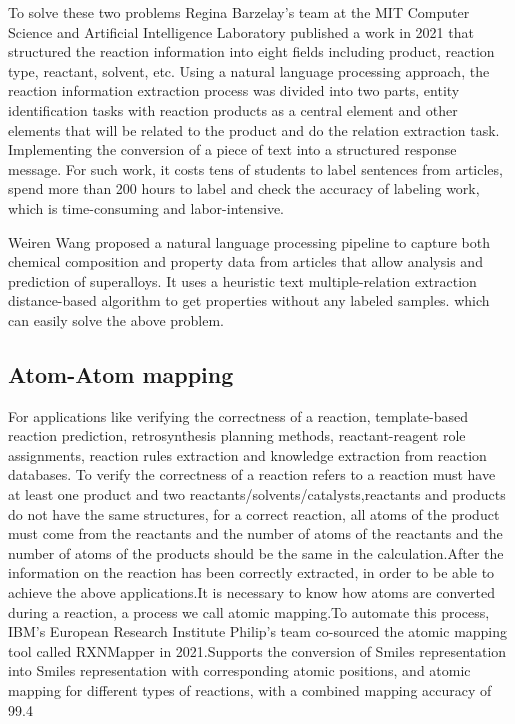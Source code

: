 \documentclass[%
 aip,
 jmp,%
 amsmath,amssymb,
 reprint,%
]{revtex4-2}
\begin{document}
To solve these two problems Regina Barzelay's team at the MIT Computer Science and Artificial Intelligence Laboratory published a work 
in 2021 that structured the reaction information into eight fields including product, reaction type, reactant, solvent, etc. Using a 
natural language processing approach, the reaction information extraction process was divided into two parts, entity identification tasks
with reaction products as a central element and other elements that will be related to the product and do the relation extraction task.
Implementing the conversion of a piece of text into a structured response message. For such work, it costs tens of students to label sentences
from articles, spend more than 200 hours to label and check the accuracy of labeling work, which is time-consuming and labor-intensive.

Weiren Wang proposed a natural language processing pipeline to capture both chemical composition and property data from articles that allow analysis
and prediction of superalloys. It uses a heuristic text multiple-relation extraction distance-based algorithm to get properties without any labeled samples.
which can easily solve the above problem.

\subsection{Atom-Atom mapping}
For applications like verifying the correctness of a reaction, template-based reaction prediction, 
retrosynthesis planning methods, reactant-reagent role assignments, reaction rules extraction and knowledge
extraction from reaction databases. To verify the correctness of a reaction refers to a reaction must have 
at least one product and two reactants/solvents/catalysts,reactants and products do not have the same structures,
for a correct reaction, all atoms of the product must come from the reactants and the number of atoms of the
reactants and the number of atoms of the products should be the same in the calculation.After the information on 
the reaction has been correctly extracted, in order to be able to achieve the above applications.It is necessary
to know how atoms are converted during a reaction, a process we call atomic mapping.To automate this process, 
IBM's European Research Institute Philip's team co-sourced the atomic mapping tool called RXNMapper 
in 2021.Supports the conversion of Smiles representation into Smiles representation with 
corresponding atomic positions, and atomic mapping for different types of reactions, 
with a combined mapping accuracy of 99.4%
\end{document}
